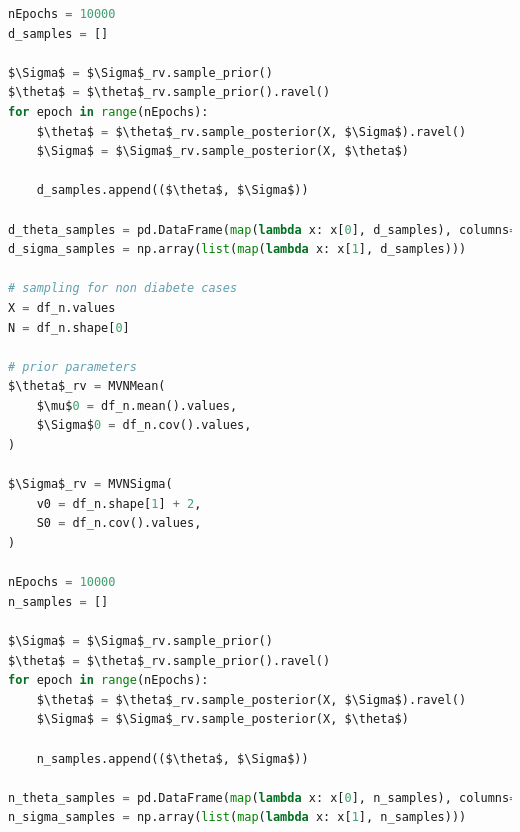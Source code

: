 \documentclass[11pt, letterpaper]{article}
\begin{document}
\begin{lstlisting}[language=Python]
nEpochs = 10000
d_samples = []

$\Sigma$ = $\Sigma$_rv.sample_prior()
$\theta$ = $\theta$_rv.sample_prior().ravel()
for epoch in range(nEpochs):
    $\theta$ = $\theta$_rv.sample_posterior(X, $\Sigma$).ravel()
    $\Sigma$ = $\Sigma$_rv.sample_posterior(X, $\theta$)

    d_samples.append(($\theta$, $\Sigma$))

d_theta_samples = pd.DataFrame(map(lambda x: x[0], d_samples), columns=df.columns[:-1])
d_sigma_samples = np.array(list(map(lambda x: x[1], d_samples)))

# sampling for non diabete cases
X = df_n.values
N = df_n.shape[0]

# prior parameters
$\theta$_rv = MVNMean(
    $\mu$0 = df_n.mean().values,
    $\Sigma$0 = df_n.cov().values,
)

$\Sigma$_rv = MVNSigma(
    v0 = df_n.shape[1] + 2,
    S0 = df_n.cov().values,
)

nEpochs = 10000
n_samples = []

$\Sigma$ = $\Sigma$_rv.sample_prior()
$\theta$ = $\theta$_rv.sample_prior().ravel()
for epoch in range(nEpochs):
    $\theta$ = $\theta$_rv.sample_posterior(X, $\Sigma$).ravel()
    $\Sigma$ = $\Sigma$_rv.sample_posterior(X, $\theta$)

    n_samples.append(($\theta$, $\Sigma$))

n_theta_samples = pd.DataFrame(map(lambda x: x[0], n_samples), columns=df.columns[:-1])
n_sigma_samples = np.array(list(map(lambda x: x[1], n_samples)))
\end{lstlisting}
\end{document}
